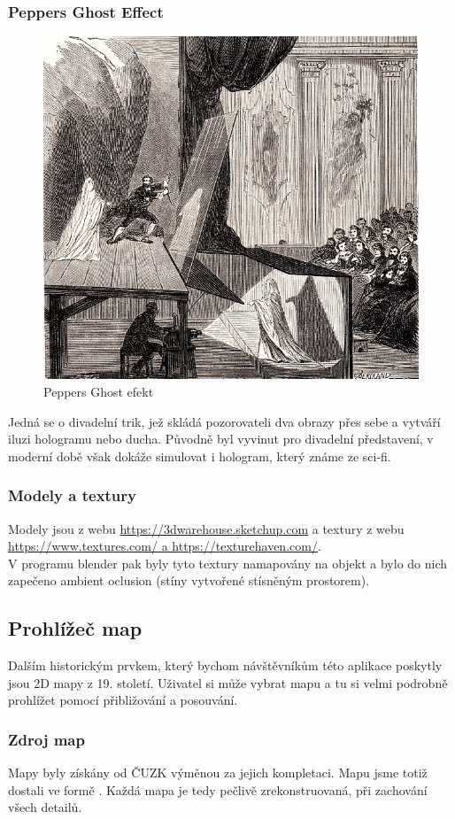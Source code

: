 \subsubsection{Peppers Ghost Effect}
\begin{figure}[H]
	\centering
	\includegraphics[width=.5\textwidth]{img/Peppers_Ghost.jpg}
	\caption[Peppers Ghost efekt - zdroj: \url{https://commons.wikimedia.org/wiki/File:Peppers_Ghost.jpg}]{Peppers Ghost efekt}
\end{figure}

Jedná se o divadelní trik, jež skládá pozorovateli dva obrazy přes sebe a vytváří iluzi
hologramu nebo ducha. Původně byl vyvinut pro divadelní představení, v moderní
době však dokáže simulovat i hologram, který známe ze sci-fi.

\subsubsection{Modely a textury}
Modely jsou z webu \url{https://3dwarehouse.sketchup.com} a
textury z webu \url{https://www.textures.com/ a https://texturehaven.com/}.\\
V programu blender pak byly tyto textury namapovány na objekt a bylo do nich
zapečeno ambient oclusion (stíny vytvořené stísněným prostorem).



\subsection{Prohlížeč map}
Dalším historickým prvkem, který bychom návštěvníkům této aplikace poskytly jsou
2D mapy z 19. století. Uživatel si může vybrat mapu a tu si velmi podrobně
prohlížet pomocí přibližování a posouvání.

\subsubsection{Zdroj map}
Mapy byly získány od ČUZK výměnou za jejich kompletaci.
Mapu jsme totiž dostali ve formě .
Každá mapa je tedy pečlivě zrekonstruovaná, při zachování všech detailů.
